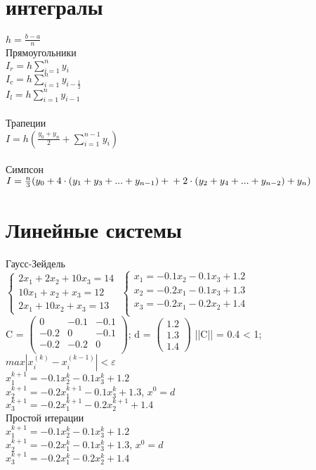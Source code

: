 \documentclass{article}
\begin{document}
\section{интегралы}
$h = \frac{b-a}{n}$\\
Прямоугольники\\
$I_r = h\sum_{i=1}^{n}y_i$\\
$I_c = h\sum_{i=1}^{n}y_{i-\frac{1}{2}}$\\
$I_l = h\sum_{i=1}^{n}y_{i-1}$
\\ \\
Трапеции\\
$I = h(\frac{y_0+y_n}{2}+\sum_{i=1}^{n-1}y_i)$
\\ \\
Симпсон\\
$I = \frac{n}{3}(y_0+4\cdot(y_1+y_3+...+y_{n-1})+ \\+2\cdot(y_2+y_4+...+y_{n-2})+y_n)$

\section{Линейные системы}
Гаусс-Зейдель\\
$\begin{cases}
    2x_1+2x_2+10x_3 = 14\\
    10x_1+x_2+x_3 = 12\\
    2x_1+10x_2+x_3=13
\end{cases}$
$\begin{cases}
    x_1 = -0.1x_2 -0.1x_3+1.2\\
    x_2 = -0.2x_1 -0.1x_3+1.3\\
    x_3 = -0.2x_1 -0.2x_2+1.4\\
\end{cases}$
\\ 
C = 
$\begin{pmatrix}
    0&-0.1&-0.1\\
    -0.2&0&-0.1\\
    -0.2&-0.2&0\\
\end{pmatrix}$; 
d = 
$\begin{pmatrix}
    1.2\\
    1.3\\ 
    1.4
\end{pmatrix}$
||C|| = 0.4 < 1;
\\
$max|x_i^{(k)}-x_i^{(k-1)}|<\varepsilon$
\\
$x_1^{k+1} = -0.1x_2^k-0.1x_3^k+1.2$\\
$x_2^{k+1} = -0.2x_1^{k+1}-0.1x_3^k+1.3$,  $x^0 = d$\\
$x_3^{k+1} = -0.2x_1^{k+1}-0.2x_2^{k+1}+1.4$\\
Простой итерации\\
$x_1^{k+1} = -0.1x_2^k-0.1x_3^k+1.2$\\
$x_2^{k+1} = -0.2x_1^k-0.1x_3^k+1.3$,  $x^0 = d$\\
$x_3^{k+1} = -0.2x_1^k-0.2x_2^k+1.4$\\
\end{document}
